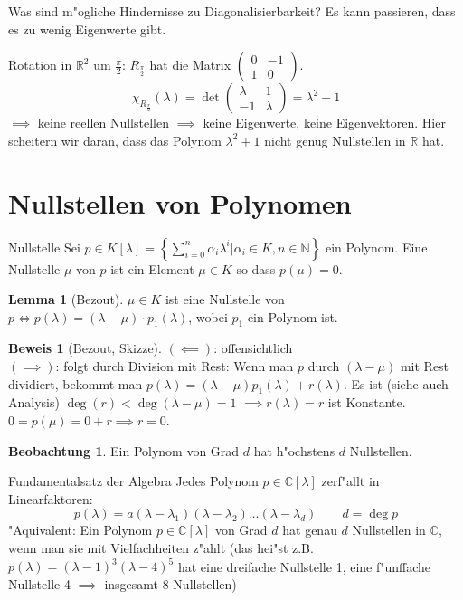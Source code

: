 \documentclass[oneside,fontsize=11pt,paper=a4,BCOR=0mm,DIV=12,automark,headsepline]{scrbook}
\newcommand{\gq}[1]{\glqq{}#1\grqq{}} %
\DeclareMathOperator{\mDeg}{deg}
\theoremstyle{remark}
\theoremstyle{definition}
\newtheorem{beobachtung}{Beobachtung}
\newtheorem{lemma}{Lemma}[section]
\theoremstyle{definition}
\newtheorem*{prof}{Beweis}
\theoremstyle{remark}
\begin{document}
Was sind m"ogliche Hindernisse zu Diagonalisierbarkeit?
Es kann passieren, dass es \gq{zu wenig} Eigenwerte gibt.
\begin{exa}[Rotation]
  Rotation in \(\mathbb{R}^2\) um \(\frac{\pi}{2}\): \(R_{\frac{\pi}{2}}\) hat die Matrix \(
  \begin{pmatrix}
    0 & -1 \\
    1 & 0
  \end{pmatrix}
  \).
  \[\chi_{R_{\frac{\pi}{2}}}(\lambda) = \det
    \begin{pmatrix}
      \lambda & 1\\
      -1 & \lambda
    \end{pmatrix}
    = \lambda^2 + 1
  \] \(\implies\) keine reellen Nullstellen \(\implies\) keine Eigenwerte, keine Eigenvektoren. Hier scheitern wir daran, dass das Polynom \(\lambda^2+1\) nicht genug Nullstellen in \(\mathbb{R}\) hat.
\end{exa}

\section{Nullstellen von Polynomen}
\begin{definition}{Nullstelle}{}
  Sei \(p\in K[\lambda] = \left\{\sum_{i=0}^n\alpha_i\lambda^i|\alpha_i\in K, n\in\mathbb{N} \right\}\) ein Polynom. Eine Nullstelle \(\mu\) von \(p\) ist ein Element \(\mu\in K\) so dass \(p(\mu) = 0\).
\end{definition}
\begin{lemma}[Bezout]
  \(\mu\in K\) ist eine Nullstelle von \(p \iff p(\lambda) = (\lambda-\mu)\cdot p_1(\lambda)\), wobei \(p_1\) ein Polynom ist.
\end{lemma}
\begin{prof}[Bezout, Skizze]
  \((\impliedby)\): offensichtlich \\
  \((\implies)\): folgt durch Division mit Rest: Wenn man \(p\) durch \((\lambda-\mu)\) mit Rest dividiert, bekommt man \(p(\lambda) = (\lambda-\mu)p_1(\lambda) + r(\lambda)\). Es ist (siehe auch Analysis) \(\mDeg(r) < \mDeg(\lambda-\mu) = 1\) \(\implies r(\lambda)=r\) ist Konstante. \(0 = p(\mu) = 0 + r \implies r = 0\).
\end{prof}
\begin{beobachtung}
  Ein Polynom von Grad \(d\) hat h"ochstens \(d\) Nullstellen.
\end{beobachtung}
\begin{theo}{Fundamentalsatz der Algebra}
  Jedes Polynom \(p\in\mathbb{C}[\lambda]\) zerf"allt in Linearfaktoren:
  \[p(\lambda) = a(\lambda - \lambda_1)(\lambda-\lambda_2)\dots(\lambda-\lambda_d) \qquad d = \mDeg p\]
  "Aquivalent: Ein Polynom \(p\in\mathbb{C}[\lambda]\) von Grad \(d\) hat genau \(d\) Nullstellen in \(\mathbb{C}\), wenn man sie mit Vielfachheiten z"ahlt (das hei"st z.B. \(p(\lambda) = (\lambda-1)^3(\lambda-4)^5\) hat eine dreifache Nullstelle 1, eine f"unffache Nullstelle 4 \(\implies\) insgesamt 8 Nullstellen)
\end{theo}
\end{document}
